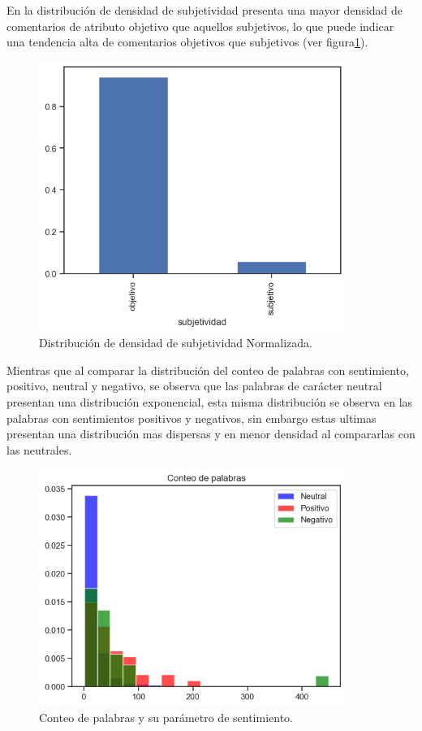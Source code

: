 En la distribución de densidad de subjetividad presenta una mayor densidad de comentarios de atributo objetivo que aquellos subjetivos, lo que puede indicar una tendencia alta de comentarios objetivos que subjetivos (ver figura\ref{fig:DDSbN}).\\


\begin{figure}[!h]
	\centering
	\includegraphics[width=10cm]{Images/Densidad_subjetividad}
	\caption{Distribución de densidad de subjetividad Normalizada.}
	\label{fig:DDSbN}
\end{figure}

Mientras que al comparar la distribución del conteo de palabras con sentimiento, positivo, neutral y negativo, se observa que las palabras de carácter neutral presentan una distribución exponencial, esta misma distribución se observa en las palabras con sentimientos positivos y negativos, sin embargo estas ultimas presentan una distribución mas dispersas y en menor densidad al compararlas con las neutrales.

\begin{figure}[!h]
	\centering
	\includegraphics[width=10cm]{Images/Palabras_sentimiento}
	\caption{Conteo de palabras y su parámetro de sentimiento.}
	\label{fig:CPPS}
\end{figure}

